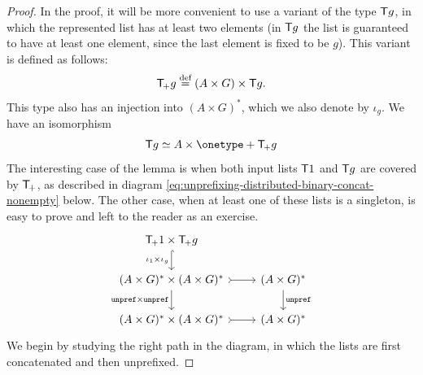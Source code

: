 \begin{proof}
    In the proof, it will be more convenient to use a variant of the type $\mathsf T g$, in which the represented list has at least two elements (in $\mathsf T g$ the list is guaranteed to have  at least one element, since the last element is fixed to be $g$). This variant is defined as follows:
    \begin{align*}
    \mathsf T_{\!+} g \stackrel{\text{def}}= (A \times G) \times \mathsf T g.
    \end{align*}
    This type also has an injection into $(A \times G)^*$, which we also denote by $\iota_g$.     We have an isomorphism 
    \begin{align*}
    \functor g \simeq A \times \onetype + \functorplus g
    \end{align*}
The interesting case of the lemma is when both input lists $\mathsf T 1$ and $\mathsf T g$ are covered by $\mathsf T_{\!+}$, as described in diagram \eqref{eq:unprefixing-distributed-binary-concat-nonempty} below.
The other case, when at least one of these lists is a singleton, is easy to prove and left to the reader as an exercise. 
\begin{equation}
\label{eq:unprefixing-distributed-binary-concat-nonempty}
\begin{tikzcd}[ampersand replacement=\&]
\functorplus \groupid \times \functorplus g
\ar[d, hookrightarrow, "\iota_\groupid \times \iota_g"']
\\
(A \times G)^* \times (A \times G)^*
\ar[d, "\unprefterm \times \unprefterm"']
\ar[r,\concar]
\& 
(A \times G)^*
\ar[d, "\unprefterm"]
\\
(A \times G)^* \times (A \times G)^*
\ar[r,\concar]
\& 
(A \times G)^*
\end{tikzcd}
\end{equation}
We begin by studying the right path in the diagram, in which the lists are first concatenated and then unprefixed.


\end{proof}
